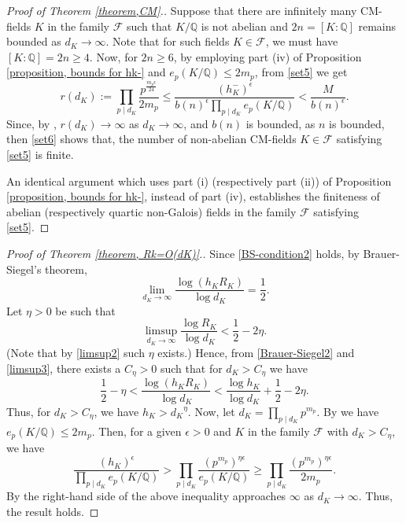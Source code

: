 \documentclass[12pt]{amsart}
\theoremstyle{definition}
\numberwithin{equation}{section}
\begin{document}
\begin{proof}[Proof of Theorem \ref{theorem,CM}.]
Suppose that there are infinitely many CM-fields $K$ in the family $\mathcal{F}$ such that $K/\mathbb{Q}$ is not abelian and $ 2n=[K:\mathbb{Q}]$ remains bounded as $d_K \rightarrow \infty$. 
Note that for such fields $K \in \mathcal{F}$, we must have $[K:\mathbb{Q}]=2n \geq 4$. Now, for $2n \geq 6$, by employing part (iv) of 
Proposition \ref{proposition, bounds for hk-} and 
$e_p(K/\mathbb{Q})\leq 2m_p$, from \eqref{set5} we get
\begin{equation}
\label{set6}
r(d_K):= \prod_{p \mid d_K} \frac{p^{\frac{m_p \epsilon}{24}} }{2m_p} \leq \frac{(h_K^-)^{\epsilon}}{b(n)^{\epsilon}\prod_{p \mid d_K} e_p(K/\mathbb{Q})} <\frac{M}{b(n)^\epsilon}.
\end{equation}
Since, by \cite[Theorem 316]{Hardy}, $r(d_K) \rightarrow \infty$ as $d_K\rightarrow \infty$, and  $b(n)$ is bounded, as $n$ is bounded, then \eqref{set6} shows that, the number of non-abelian CM-fields $K \in \mathcal{F}$ satisfying \eqref{set5} is finite. 

An identical argument which uses part (i) (respectively part (ii)) of 
Proposition \ref{proposition, bounds for hk-},  instead of part (iv), establishes the finiteness of abelian  (respectively quartic non-Galois) fields in the family $\mathcal{F}$ satisfying \eqref{set5}.
\end{proof}

\begin{proof}[Proof of Theorem \ref{theorem, Rk=O(dK)}.]
Since \eqref{BS-condition2} holds, by Brauer-Siegel's theorem,
\begin{equation}
\label{Brauer-Siegel2}
\lim_{d_K \rightarrow \infty} \frac{\log (h_K R_K)}{\log{d_K}}=\frac{1}{2}.		
\end{equation}
Let $\eta>0$ be such that 
\begin{equation}
\label{limsup3}
\limsup_{d_K\rightarrow \infty} \frac{\log{R_K}}{\log{d_K}}<\frac{1}{2}-2\eta.
\end{equation}
(Note that by \eqref{limsup2} such $\eta$ exists.)
Hence, from \eqref{Brauer-Siegel2} and \eqref{limsup3}, there exists a $C_{\eta}>0$ such that for $d_K>C_{\eta}$ we have
\begin{equation*}
\frac{1}{2}-\eta <\frac{\log {(h_K R_K)}}{\log{d_K}}<\frac{\log {h_K}}{\log{d_K}} +\frac{1}{2}-2\eta.
\end{equation*}
Thus, for $d_K > C_{\eta}$, we have $h_K > {d_K}^{\eta}$. Now, let 
	$d_K=\prod_{p \mid d_K} p ^{m_p}.$
By \cite[Chapter III, Proposition 8]{Lang} we have 
$e_p(K/\mathbb{Q})\leq 2m_p$.
Then, for a given $\epsilon>0$ and $K$ in the family $\mathcal{F}$  with $d_K>C_{\eta}$, we have
\begin{equation*}
\frac{(h_K)^{\epsilon}}{\prod_{p \mid d_K} e_p(K/\mathbb{Q})} > \prod_{p \mid d_K} \frac{(p^{m_p})^{\eta \epsilon}}{e_p(K/\mathbb{Q})} \geq  \prod_{p \mid d_K} \frac{(p^{m_p})^{\eta \epsilon}}{2 m_p}.
\end{equation*}
By \cite[Theorem 316]{Hardy} the right-hand side of the above inequality approaches $\infty$ as $d_K \rightarrow \infty$. Thus, the result holds.
\end{proof}
\end{document}
